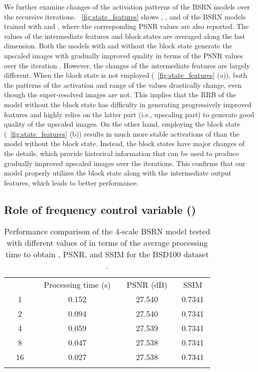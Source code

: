 \documentclass[runningheads]{llncs}
\begin{document}
We further examine changes of the activation patterns of the BSRN models over the recursive iterations.
\figurename~\ref{fig:state_features} shows , , and  of the BSRN models trained with  and , where the corresponding PSNR values are also reported.
The values of the intermediate features and block states are averaged along the last dimension.
Both the models with and without the block state generate the upscaled images with gradually improved quality in terms of the PSNR values over the iteration .
However, the changes of the intermediate features are largely different.
When the block state is not employed (\figurename~\ref{fig:state_features} (a)), both the patterns of the activation and range of the values drastically change, even though the super-resolved images are not.
This implies that the RRB of the model without the block state has difficulty in generating progressively improved features and highly relies on the latter part (i.e., upscaling part) to generate good quality of the upscaled images.
On the other hand, employing the block state (\figurename~\ref{fig:state_features} (b)) results in much more stable activations of  than the model without the block state.
Instead, the block states  have major changes of the details, which provide historical information that can be used to produce gradually improved upscaled images over the iterations.
This confirms that our model properly utilizes the block state along with the intermediate output features, which leads to better performance.


\subsection{Role of frequency control variable ()}
\label{sec:r_role}

\begin{table}[t]
	\scriptsize
	\begin{center}
		\begin{tabular}{c c c c}
			\noalign{\smallskip}
			\hline
			\noalign{\smallskip}
			~~~~~~ & ~Processing time (s)~ & ~PSNR (dB)~ & ~SSIM~ \\
			\noalign{\smallskip}
			\hline
			\noalign{\smallskip}
			1 & 0.152 & 27.540 & 0.7341 \\
			2 & 0.094 & 27.540 & 0.7341 \\
			4 & 0.059 & 27.539 & 0.7341 \\
			8 & 0.047 & 27.538 & 0.7341 \\
			16 & 0.027 & 27.538 & 0.7341 \\
			\noalign{\smallskip}
			\hline
			\noalign{\smallskip}
		\end{tabular}
	\end{center}
	\caption{Performance comparison of the 4-scale BSRN model tested with different values of  in terms of the average processing time to obtain , PSNR, and SSIM for the BSD100 dataset \cite{martin2001database}.}
	\label{table:frequency_control_speed}
\end{table}
\end{document}
